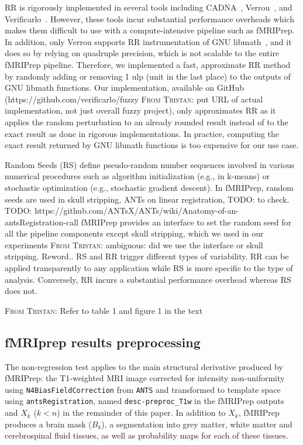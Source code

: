 \documentclass{article}
\newcommand{\TODO}[1]{\color{red}\textsc{TODO:} #1\color{black}\xspace}
\newcommand{\TG}[1]{\color{blue}\textsc{From Tristan:} #1\color{black}\xspace}
\newcommand{\fmriprep}{fMRIPrep\xspace}
\begin{document}
RR is rigorously implemented in several tools including CADNA~\cite{jezequel2008cadna}, Verrou~\cite{fevotte2016verrou}, and Verificarlo~\cite{denis2016verificarlo}. However, these tools incur substantial performance overheads which makes them difficult to use with a compute-intensive pipeline such as fMRIPrep. In addition, only Verrou supports RR instrumentation of GNU libmath~\cite{fevotte2019debugging}, and it does so by relying on quadruple precision, which is not scalable to the entire fMRIPrep pipeline. Therefore, we implemented a fast, approximate RR method by randomly adding or removing 1 ulp (unit in the last place) to the outputs of GNU libmath functions. Our implementation, available on GitHub (https://github.com/verificarlo/fuzzy \TG{put URL of actual implementation, not just overall fuzzy project}),  only approximates RR as it applies the random perturbation to an already rounded result instead of to the exact result as done in rigorous implementations. In practice, computing the exact result returned by GNU libmath functions is too expensive for our use case.

Random Seeds (RS) define pseudo-random number sequences involved in various numerical procedures such as algorithm initialization (e.g., in k-means) or stochastic optimization (e.g., stochastic gradient descent). In fMRIPrep, random seeds are used in skull stripping, ANTs on linear registration, \TODO{to check}. \TODO{https://github.com/ANTsX/ANTs/wiki/Anatomy-of-an-antsRegistration-call} fMRIPrep provides an interface to set the random seed for all the pipeline components except skull stripping, which we used in our experiments \TG{ambiguous: did we use the interface or skull stripping. Reword.}. RS and RR trigger different types of variability. RR can be applied transparently to any application while RS is more specific to the type of analysis. Conversely, RR incurs a substantial performance overhead whereas RS does not.

\TG{Refer to table 1 and figure 1 in the text}

\subsection{fMRIprep results preprocessing}

The non-regression test applies to the main structural derivative produced by \fmriprep: the T1-weighted MRI image corrected for intensity non-uniformity using \texttt{N4BiasFieldCorrection} from \texttt{ANTS} and transformed to template space using \texttt{antsRegistration}, named \texttt{desc-preproc\_T1w} in the \fmriprep outputs and $X_k$ ($k < n$) in the remainder of this paper. In addition to $X_k$, \fmriprep produces a brain mask ($B_k$), a segmentation into grey matter, white matter and cerebrospinal fluid tissues, as well as probability maps for each of these tissues.
\end{document}

